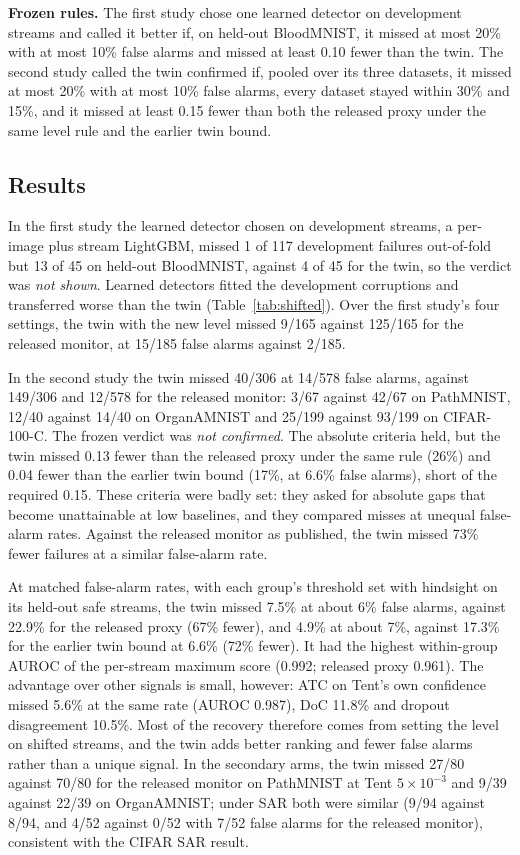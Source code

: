 \documentclass[runningheads]{llncs}
\begin{document}
\textbf{Frozen rules.} The first study chose one learned detector on development streams and called it better if, on held-out BloodMNIST, it missed at most 20\% with at most 10\% false alarms and missed at least 0.10 fewer than the twin. The second study called the twin confirmed if, pooled over its three datasets, it missed at most 20\% with at most 10\% false alarms, every dataset stayed within 30\% and 15\%, and it missed at least 0.15 fewer than both the released proxy under the same level rule and the earlier twin bound.

\subsection{Results}
In the first study the learned detector chosen on development streams, a per-image plus stream LightGBM, missed 1 of 117 development failures out-of-fold but 13 of 45 on held-out BloodMNIST, against 4 of 45 for the twin, so the verdict was \emph{not shown}. Learned detectors fitted the development corruptions and transferred worse than the twin (Table~\ref{tab:shifted}). Over the first study's four settings, the twin with the new level missed 9/165 against 125/165 for the released monitor, at 15/185 false alarms against 2/185.

In the second study the twin missed 40/306 at 14/578 false alarms, against 149/306 and 12/578 for the released monitor: 3/67 against 42/67 on PathMNIST, 12/40 against 14/40 on OrganAMNIST and 25/199 against 93/199 on CIFAR-100-C. The frozen verdict was \emph{not confirmed}. The absolute criteria held, but the twin missed 0.13 fewer than the released proxy under the same rule (26\%) and 0.04 fewer than the earlier twin bound (17\%, at 6.6\% false alarms), short of the required 0.15. These criteria were badly set: they asked for absolute gaps that become unattainable at low baselines, and they compared misses at unequal false-alarm rates. Against the released monitor as published, the twin missed 73\% fewer failures at a similar false-alarm rate.

At matched false-alarm rates, with each group's threshold set with hindsight on its held-out safe streams, the twin missed 7.5\% at about 6\% false alarms, against 22.9\% for the released proxy (67\% fewer), and 4.9\% at about 7\%, against 17.3\% for the earlier twin bound at 6.6\% (72\% fewer). It had the highest within-group AUROC of the per-stream maximum score (0.992; released proxy 0.961). The advantage over other signals is small, however: ATC on Tent's own confidence missed 5.6\% at the same rate (AUROC 0.987), DoC 11.8\% and dropout disagreement 10.5\%. Most of the recovery therefore comes from setting the level on shifted streams, and the twin adds better ranking and fewer false alarms rather than a unique signal. In the secondary arms, the twin missed 27/80 against 70/80 for the released monitor on PathMNIST at Tent $5\times10^{-3}$ and 9/39 against 22/39 on OrganAMNIST; under SAR both were similar (9/94 against 8/94, and 4/52 against 0/52 with 7/52 false alarms for the released monitor), consistent with the CIFAR SAR result.
\end{document}
